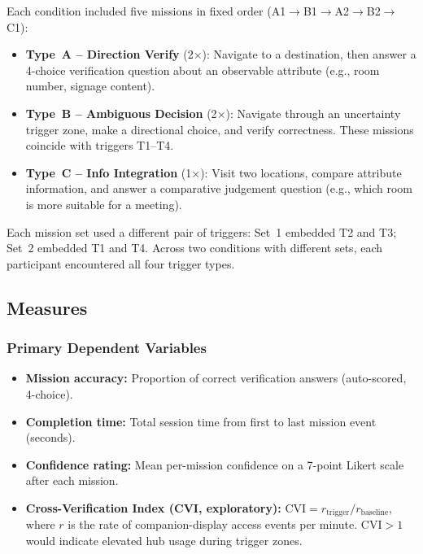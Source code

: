 \documentclass[review]{vgtc}           %
\begin{document}
Each condition included five missions in fixed order
(A1$\to$B1$\to$A2$\to$B2$\to$C1):

\begin{itemize}
\item \textbf{Type~A -- Direction Verify} (2$\times$): Navigate to a
destination, then answer a 4-choice verification question about an
observable attribute (e.g., room number, signage content).

\item \textbf{Type~B -- Ambiguous Decision} (2$\times$): Navigate
through an uncertainty trigger zone, make a directional choice, and
verify correctness. These missions coincide with triggers T1--T4.

\item \textbf{Type~C -- Info Integration} (1$\times$): Visit two
locations, compare attribute information, and answer a comparative
judgement question (e.g., which room is more suitable for a meeting).
\end{itemize}

Each mission set used a different pair of triggers: Set~1 embedded T2
and T3; Set~2 embedded T1 and T4. Across two conditions with
different sets, each participant encountered all four trigger types.

\subsection{Measures}

\subsubsection{Primary Dependent Variables}

\begin{itemize}
\item \textbf{Mission accuracy:} Proportion of correct verification
answers (auto-scored, 4-choice).
\item \textbf{Completion time:} Total session time from first to last
mission event (seconds).
\item \textbf{Confidence rating:} Mean per-mission confidence on a
7-point Likert scale after each mission.
\item \textbf{Cross-Verification Index (CVI, exploratory):}
$\text{CVI} = r_{\text{trigger}} / r_{\text{baseline}}$,
where $r$ is the rate of companion-display access events per minute.
$\text{CVI} > 1$ would indicate elevated hub usage during trigger zones.
\end{itemize}
\end{document}
